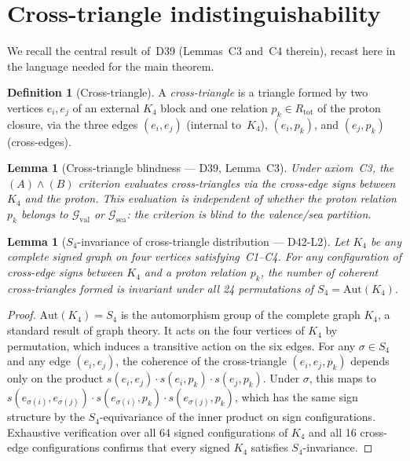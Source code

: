 \documentclass[11pt,a4paper]{article}
\theoremstyle{plain}
\newtheorem{lemma}[theorem]{Lemma}
\theoremstyle{definition}
\newtheorem{definition}[theorem]{Definition}
\theoremstyle{remark}
\newcommand{\Kfour}{K_4}
\newcommand{\Rtot}{R_{\mathrm{tot}}}
\begin{document}
\section{Cross-triangle indistinguishability}
\label{sec:lemma2}

We recall the central result of~D39 (Lemmas~C3 and~C4 therein), recast here in the language needed for the main theorem.

\begin{definition}[Cross-triangle]
A \emph{cross-triangle} is a triangle formed by two vertices $e_i, e_j$ of an external $\Kfour$ block and one relation $p_k \in \Rtot$ of the proton closure, via the three edges $(e_i, e_j)$ (internal to~$\Kfour$), $(e_i, p_k)$, and $(e_j, p_k)$ (cross-edges).
\end{definition}

\begin{lemma}[Cross-triangle blindness --- D39, Lemma~C3]
\label{lem:blind}
Under axiom~C3, the $(A)\wedge(B)$ criterion evaluates cross-triangles via the cross-edge signs between $\Kfour$ and the proton. This evaluation is independent of whether the proton relation $p_k$ belongs to $\mathcal{G}_{\mathrm{val}}$ or $\mathcal{G}_{\mathrm{sea}}$: the criterion is blind to the valence/sea partition.
\end{lemma}

\begin{lemma}[$S_4$-invariance of cross-triangle distribution --- D42-L2]
\label{lem:s4}
Let $\Kfour$ be any complete signed graph on four vertices satisfying~C1--C4. For any configuration of cross-edge signs between $\Kfour$ and a proton relation $p_k$, the number of coherent cross-triangles formed is invariant under all 24 permutations of $S_4 = \mathrm{Aut}(\Kfour)$.
\end{lemma}

\begin{proof}
$\mathrm{Aut}(\Kfour) = S_4$ is the automorphism group of the complete graph $K_4$, a standard result of graph theory. It acts on the four vertices of $\Kfour$ by permutation, which induces a transitive action on the six edges. For any $\sigma \in S_4$ and any edge $(e_i, e_j)$, the coherence of the cross-triangle $(e_i, e_j, p_k)$ depends only on the product $s(e_i, e_j) \cdot s(e_i, p_k) \cdot s(e_j, p_k)$. Under $\sigma$, this maps to $s(e_{\sigma(i)}, e_{\sigma(j)}) \cdot s(e_{\sigma(i)}, p_k) \cdot s(e_{\sigma(j)}, p_k)$, which has the same sign structure by the $S_4$-equivariance of the inner product on sign configurations. Exhaustive verification over all 64 signed configurations of $\Kfour$ and all 16 cross-edge configurations confirms that every signed $\Kfour$ satisfies $S_4$-invariance.
\end{proof}
\end{document}
